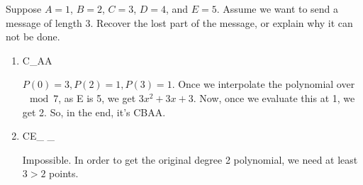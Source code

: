 \question Suppose $A = 1$, $B = 2$, $C = 3$, $D = 4$, and $E = 5$. 
Assume we want to send a message of length 3. Recover the lost part 
of the message, or explain why it can not be done. 
\begin{enumerate}
\item C\_AA
\begin{solution}[1in]
$P(0) = 3, P(2) = 1, P(3) = 1$.  Once we interpolate the polynomial 
over $\mod 7$, as E is 5, we get $3x^2 + 3x + 3$. Now, once we evaluate 
this at 1, we get 2. So, in the end, it’s CBAA.
\end{solution}
\item CE\_ \_
\begin{solution}[1in]
Impossible. In order to get the original degree 2 polynomial, we 
need at least $3 > 2$ points. 
\end{solution}
\end{enumerate}